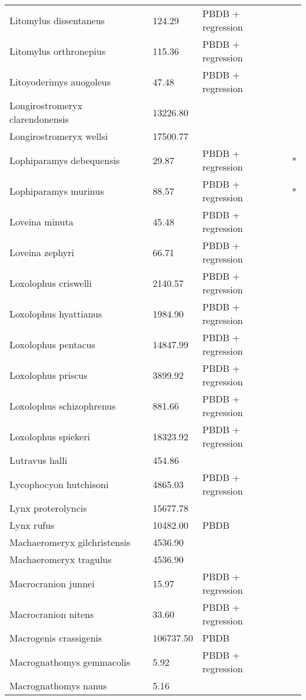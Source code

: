 \documentclass{article}
\begin{document}
\begin{center}
\begin{longtable}{p{} p{} p{} p{}}
    Litomylus dissentaneus & 124.29 & PBDB + regression &  \\ 
    Litomylus orthronepius & 115.36 & PBDB + regression &  \\ 
    Litoyoderimys auogoleus & 47.48 & PBDB + regression &  \\ 
    Longirostromeryx clarendonensis & 13226.80 & \cite{Tomiya2013} &  \\ 
    Longirostromeryx wellsi & 17500.77 & \cite{Tomiya2013} &  \\ 
    Lophiparamys debequensis & 29.87 & PBDB + regression & * \\ 
    Lophiparamys murinus & 88.57 & PBDB + regression & * \\ 
    Loveina minuta & 45.48 & PBDB + regression &  \\ 
    Loveina zephyri & 66.71 & PBDB + regression &  \\ 
    Loxolophus criswelli & 2140.57 & PBDB + regression &  \\ 
    Loxolophus hyattianus & 1984.90 & PBDB + regression &  \\ 
    Loxolophus pentacus & 14847.99 & PBDB + regression &  \\ 
    Loxolophus priscus & 3899.92 & PBDB + regression &  \\ 
    Loxolophus schizophrenus & 881.66 & PBDB + regression &  \\ 
    Loxolophus spiekeri & 18323.92 & PBDB + regression &  \\ 
    Lutravus halli & 454.86 & \cite{Tomiya2013} &  \\ 
    Lycophocyon hutchisoni & 4865.03 & PBDB + regression &  \\ 
    Lynx proterolyncis & 15677.78 & \cite{Tomiya2013} &  \\ 
    Lynx rufus & 10482.00 & PBDB &  \\ 
    Machaeromeryx gilchristensis & 4536.90 & \cite{Tomiya2013} &  \\ 
    Machaeromeryx tragulus & 4536.90 & \cite{Tomiya2013} &  \\ 
    Macrocranion junnei & 15.97 & PBDB + regression &  \\ 
    Macrocranion nitens & 33.60 & PBDB + regression &  \\ 
    Macrogenis crassigenis & 106737.50 & PBDB &  \\ 
    Macrognathomys gemmacolis & 5.92 & PBDB + regression &  \\ 
    Macrognathomys nanus & 5.16 & \cite{Tomiya2013} &  \\ 

\end{longtable}
\end{center}
\end{document}
